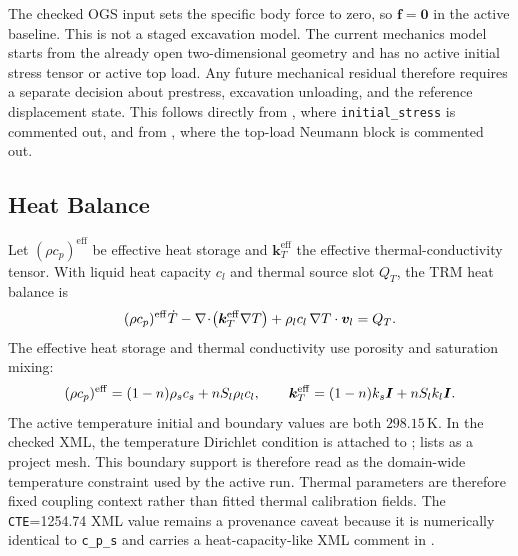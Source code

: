 The checked OGS input sets the specific body force to zero, so \(\bm{f}=\bm{0}\) in
the active baseline.  This is not a staged excavation model.  The current mechanics
model starts from the
already open two-dimensional geometry and has no active initial stress tensor or
active top load.  Any future mechanical residual therefore requires a separate
decision about prestress, excavation unloading, and the reference displacement
state.  This follows directly from , where
\texttt{initial\_stress} is commented out, and from
, where the top-load Neumann block is commented
out.



\subsection{Heat Balance}
\label{sec:heat-balance}

Let \((\rho c_p)^{\mathrm{eff}}\) be effective heat storage and
\(\bm{k}_T^{\mathrm{eff}}\) the effective thermal-conductivity tensor.  With liquid
heat capacity \(c_l\) and thermal source slot \(Q_T\), the TRM heat balance is
\begin{equation}
  (\rho c_p)^{\mathrm{eff}}\dot{T}
  -
  \nabla\!\cdot\!\left(\bm{k}_T^{\mathrm{eff}}\nabla T\right)
  +
  \rho_l c_l\,\nabla T\cdot\bm{v}_{l}
  =
  Q_T .
  \label{eq:heat-balance}
\end{equation}
The effective heat storage and thermal conductivity use porosity and saturation
mixing:
\begin{equation}
  (\rho c_p)^{\mathrm{eff}}
  =
  (1-n)\rho_s c_s + nS_l\rho_l c_l ,
  \qquad
  \bm{k}_T^{\mathrm{eff}}
  =
  (1-n)k_s\bm{I} + nS_l k_l\bm{I} .
  \label{eq:thermal-mixing}
\end{equation}
The active temperature initial and boundary values are both \(298.15\,\mathrm{K}\).
In the checked XML, the temperature Dirichlet condition is attached to
;  lists  as a
project mesh.  This boundary support is therefore read as the domain-wide
temperature constraint used by the active run.  Thermal parameters are therefore fixed
coupling context rather than fitted thermal calibration fields.
The \texttt{CTE}=1254.74 XML value remains a provenance caveat because it is
numerically identical to \texttt{c\_p\_s} and carries a heat-capacity-like XML
comment in .

